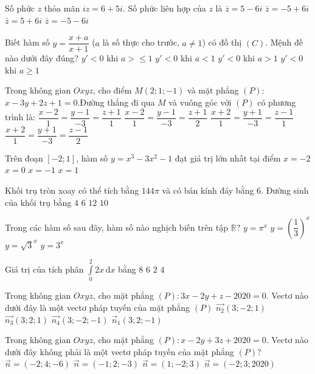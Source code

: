 \begin{ex}%
Số phức $z$ thỏa mãn $i z=6+5 i$. Số phức liên hợp của $z$ là
\choice
{$\bar{z}=5-6 i$}
{$\bar{z}=-5+6 i$}
{\True $\bar{z}=5+6 i$}
{$\bar{z}=-5-6 i$}

\end{ex}
\begin{ex}%
Biết hàm số $y=\dfrac{x+a}{x+1}$ ($a$ là số thực cho trước, $a \neq 1$) có đồ thị $(C)$. Mệnh đề nào dưới đây đúng?
\choice
{$y'<0$ khi $a>\leq 1$}
{$y'<0$ khi $a<1$}
{\True $y'<0$ khi $a>1$}
{$y'<0$ khi $a \geq 1$}

\end{ex}
\begin{ex}%
Trong không gian $O x y z$, cho điểm $M(2; 1;-1)$ và mặt phẳng $(P)$: $x-3 y+2 z+1=0$.Đường thẳng đi qua $M$ và vuông góc với $(P)$ có phương trình là:
\choice
{$\dfrac{x-2}{1}=\dfrac{y-1}{-3}=\dfrac{z+1}{1}$}
{\True $\dfrac{x-2}{1}=\dfrac{y-1}{-3}=\dfrac{z+1}{2}$}
{$\dfrac{x+2}{1}=\dfrac{y+1}{-3}=\dfrac{z-1}{1}$}
{$\dfrac{x+2}{1}=\dfrac{y+1}{-3}=\dfrac{z-1}{2}$}

\end{ex}
\begin{ex}%
Trên đoạn $[-2; 1]$, hàm số $y=x^3-3 x^2-1$ đạt giá trị lớn nhất tại điểm
\choice
{$x=-2$}
{\True $x=0$}
{$x=-1$}
{$x=1$}

\end{ex}
\begin{ex}%
Khối trụ tròn xoay có thể tích bằng $144\pi$ và có bán kính đáy bằng $6$. Đường sinh của khối trụ bằng
\choice
{\True $4$}
{$6$}
{$12$}
{$10$}

\end{ex}
\begin{ex}%
Trong các hàm số sau đây, hàm số nào nghịch biến trên tập $\mathbb{R}$?
\choice
{$y=\pi^{x}$}
{\True $y=\left(\dfrac{1}{3}\right)^{x}$}
{$y=\sqrt{3}^{x}$}
{$y=3^{x}$}

\end{ex}
\begin{ex}%
Giá trị của tích phân $\displaystyle\int\limits_0^2 2 x \mathrm{\,d} x$ bằng
\choice
{$8$}
{$6$}
{$2$}
{\True $4$}

\end{ex}

\begin{ex}%
Trong không gian $O x y z$, cho mặt phẳng $(P)\colon 3 x-2 y+z-2020=0$. Vectơ nào dưới đây là một vectơ pháp tuyến của mặt phẳng $(P)$ 
\choice
{\True $\overrightarrow{n_2}(3;-2; 1)$}
{$\overrightarrow{n_3}(3; 2; 1)$}
{$\overrightarrow{n_4}(3;-2;-1)$}
{$\vec{n}_1(3; 2;-1)$}

\end{ex}
\begin{ex}%
Trong không gian $O x y z$, cho mặt phẳng $(P)\colon x-2 y+3 z+2020=0$. Vectơ nào dưới đây không phải là một vectơ pháp tuyến của mặt phẳng $(P)?$ 
\choice
{$\vec{n}=(-2; 4;-6)$}
{$\vec{n}=(-1; 2;-3)$}
{$\vec{n}=(1;-2; 3)$}
{\True $\vec{n}=(-2; 3; 2020)$}

\end{ex}

